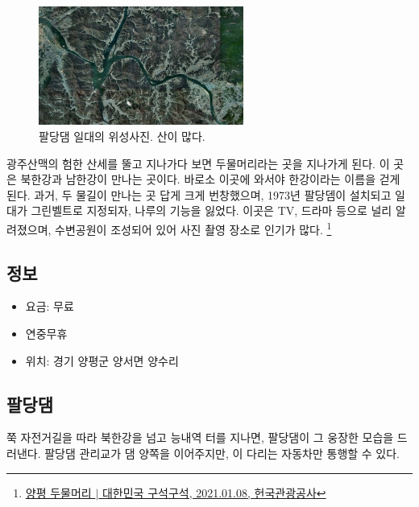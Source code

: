 \begin{figure}[ht]
    \centering
    \includegraphics[width=0.6\textwidth]{img/팔당호지도.jpg}
    \caption{팔당댐 일대의 위성사진. 산이 많다.\protect\footnotemark}
    \label{fig:my_label8}
\end{figure}


광주산맥의 험한 산세를 뚤고 지나가다 보면 두물머리라는 곳을 지나가게 된다. 이 곳은 북한강과 남한강이 만나는 곳이다.
바로소 이곳에 와서야 한강이라는 이름을 걷게 된다.
과거, 두 물길이 만나는 곳 답게 크게 번창했으며, 1973년 팔당뎀이 설치되고 일대가 그린벨트로 지정되자,
나루의 기능을 잃었다.
이곳은 TV, 드라마 등으로 널리 알려졌으며,
수변공원이 조성되어 있어 사진 촬영 장소로 인기가 많다.
\footnote{\href{https://terms.naver.com/entry.naver?docId=1997444&cid=42856&categoryId=42856}{양평 두물머리 $|$ 대한민국 구석구석, 2021.01.08, 헌국관광공사}}

\subsection{정보}
\begin{itemize}
    \item 요금: 무료
    \item 연중무휴
    \item 위치: 경기 양평군 양서면 양수리
\end{itemize}


\subsection{팔당댐}
쭉 자전거길을 따라 북한강을 넘고 능내역 터를 지나면, 팔당댐이 그 웅장한 모습을 드러낸다. 
팔당댐 관리교가 댐 양쪽을 이어주지만, 이 다리는 자동차만 통행할 수 있다.


